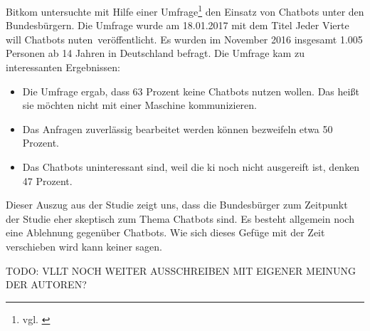 Bitkom untersuchte mit Hilfe einer Umfrage\footnote{vgl. \cite{BitkomChatbot}} den Einsatz von Chatbots unter den Bundesbürgern. Die Umfrage wurde am 18.01.2017 mit dem Titel \glqq Jeder Vierte will Chatbots nuten\grqq\ veröffentlicht. Es wurden im November 2016 insgesamt 1.005 Personen ab 14 Jahren in Deutschland befragt. Die Umfrage kam zu interessanten Ergebnissen:
\begin{itemize}
 	\item Die Umfrage ergab, dass 63 Prozent keine Chatbots nutzen wollen. Das heißt sie möchten nicht mit einer Maschine kommunizieren. 
	 \item Das Anfragen zuverlässig bearbeitet werden können bezweifeln etwa 50 Prozent.
	 \item Das Chatbots uninteressant sind, weil die \ac{ki} noch nicht ausgereift ist, denken 47 Prozent.
\end{itemize}
Dieser Auszug aus der Studie zeigt uns, dass die Bundesbürger zum Zeitpunkt der Studie eher skeptisch zum Thema Chatbots sind. Es besteht allgemein noch eine Ablehnung gegenüber Chatbots. Wie sich dieses Gefüge mit der Zeit verschieben wird kann keiner sagen.  

TODO: VLLT NOCH WEITER AUSSCHREIBEN MIT EIGENER MEINUNG DER AUTOREN?







